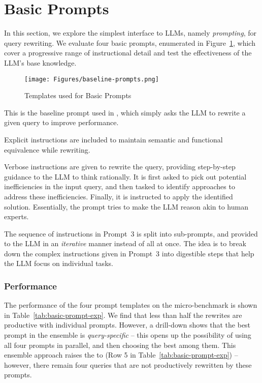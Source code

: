 \section{Basic Prompts}
\label{sec:basic-prompt}

In this section, we explore the simplest interface to LLMs, namely \textit{prompting}, for query rewriting.
%
We evaluate four basic prompts, enumerated in Figure~\ref{fig:baseline-prompts}, which cover a progressive range of instructional detail and test the effectiveness of the LLM's base knowledge. 

\begin{figure}[t]
    \centering
    \texttt{[image: Figures/baseline-prompts.png]}
    \vspace{-0.1cm}
    \caption{Templates used for Basic Prompts}
    \label{fig:baseline-prompts}
    \vspace{-0.2cm}
\end{figure}

This is the baseline prompt used in \cite{Genrewrite}, which simply asks the LLM to rewrite a given query to improve performance. 

Explicit instructions are included to maintain semantic and functional equivalence while rewriting. 

Verbose instructions are given to rewrite the query, providing step-by-step guidance to the LLM to think rationally. It is first asked to pick out potential inefficiencies in the input query, and then tasked to identify approaches to address these inefficiencies. Finally, it is instructed to apply the identified solution.  Essentially, the prompt tries to make the LLM reason akin to human experts.

The sequence of instructions in Prompt~3 is split into sub-prompts, and provided to the LLM in an \emph{iterative} manner instead of all at once. The idea is to break down the complex instructions given in Prompt~3 into digestible steps that help the LLM focus on individual tasks.

\subsubsection*{Performance}
The performance of the four prompt templates on the micro-benchmark is shown in Table~\ref{tab:basic-prompt-exp}. 
We find that less than half the rewrites are productive with individual prompts. However, a drill-down shows that the best prompt in the ensemble is \emph{query-specific} -- this opens up the possibility of using all four prompts in parallel, and then choosing the best among them. This ensemble approach  raises the \cprs to \textbf{\EnsembleRewriteMicroDS} (Row 5 in Table~\ref{tab:basic-prompt-exp}) -- however, there remain four queries that are not productively rewritten by these prompts. 


